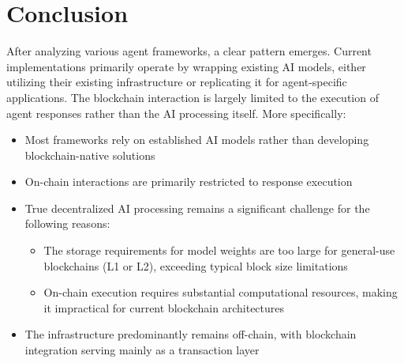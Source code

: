 \documentclass[fleqn,10pt]{olplainarticle}
\begin{document}
\section{Conclusion}
After analyzing various agent frameworks, a clear pattern emerges. Current implementations primarily operate by wrapping existing AI models, either utilizing their existing infrastructure or replicating it for agent-specific applications. The blockchain interaction is largely limited to the execution of agent responses rather than the AI processing itself.
More specifically:
\begin{itemize}[noitemsep]
	\item Most frameworks rely on established AI models rather than developing blockchain-native solutions
	\item On-chain interactions are primarily restricted to response execution
	\item True decentralized AI processing remains a significant challenge for the following reasons:
	\begin{itemize}[noitemsep]
		\item The storage requirements for model weights are too large for general-use blockchains (L1 or L2), exceeding typical block size limitations
		\item On-chain execution requires substantial computational resources, making it impractical for current blockchain architectures
	\end{itemize}
	\item The infrastructure predominantly remains off-chain, with blockchain integration serving mainly as a transaction layer
\end{itemize}


\end{document}
